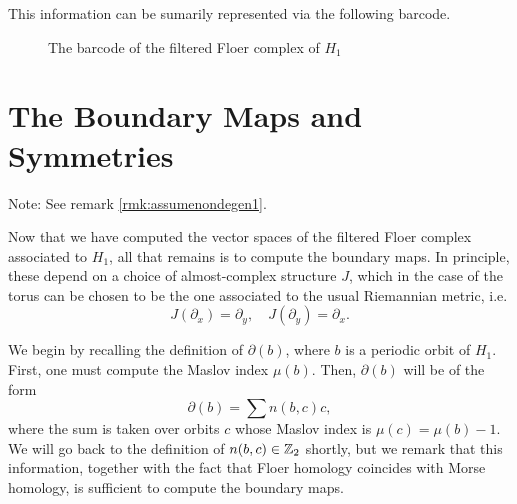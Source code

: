 \begin{prop}
This information can be sumarily represented via the following barcode.
\begin{figure}[H]
\centering
{}
\caption{The barcode of the filtered Floer complex of $H_1$}
\end{figure}
\end{prop}

\section{The Boundary Maps and Symmetries}\label{sec:symmetries}

Note: See remark \ref{rmk:assumenondegen1}.

\medskip

Now that we have computed the vector spaces of the filtered Floer complex associated to $H_1$, all that remains is to compute the boundary maps. In principle, these depend on a choice of almost-complex structure $J$, which in the case of the torus can be chosen to be the one associated to the usual Riemannian metric, i.e.
\begin{equation}
J(\partial_x) = \partial_y, \quad J(\partial_y) = \partial_x.
\end{equation}

We begin by recalling the definition of $\partial(b)$, where $b$ is a periodic orbit of $H_1$. First, one must compute the Maslov index $\mu(b)$. Then, $\partial(b)$ will be of the form
\begin{equation}
\partial(b) = \sum n(b,c) c,
\end{equation}
where the sum is taken over orbits $c$ whose Maslov index is $\mu(c) = \mu(b)-1$. We will go back to the definition of $n(b,c) \in \mathbb{Z}_2$ shortly, but we remark that this information, together with the fact that Floer homology coincides with Morse homology, is sufficient to compute the boundary maps.

